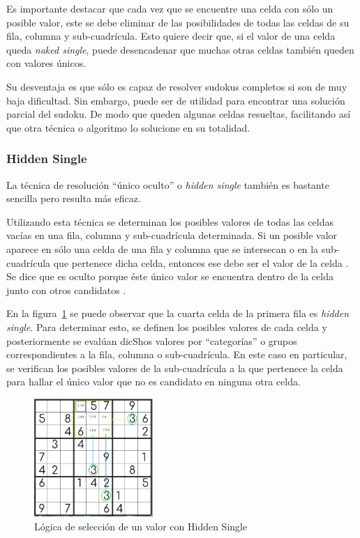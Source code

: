 \documentclass[conference]{IEEEtran}
\begin{document}
Es importante destacar que cada vez que se encuentre una celda con sólo un posible valor, este se debe eliminar de las posibilidades de todas las celdas de su fila, columna y sub-cuadrícula. Esto quiere decir que, si el valor de una celda queda \textit{naked single}, puede desencadenar que muchas otras celdas también queden con valores únicos.

Su desventaja es que sólo es capaz de resolver sudokus completos si son de muy baja dificultad. Sin embargo, puede ser de utilidad para encontrar una solución parcial del sudoku. De modo que queden algunas celdas resueltas, facilitando así que otra técnica o algoritmo lo solucione en su totalidad.

\subsubsection{Hidden Single}
La técnica de resolución “único oculto” o \textit{hidden single} también es bastante sencilla pero resulta más eficaz.

Utilizando esta técnica se determinan los posibles valores de todas las celdas vacías en una fila, columna y sub-cuadrícula determinada. Si un posible valor aparece en sólo una celda de una fila y columna que se intersecan o en la sub-cuadrícula que pertenece dicha celda, entonces ese debe ser el valor de la celda \cite{hiddenSolving}. Se dice que es oculto porque éste único valor se encuentra dentro de la celda junto con otros candidatos \cite{individual}.

En la figura~\ref{fig:hidden1} se puede observar que la cuarta celda de la primera fila es \textit{hidden single}. Para determinar esto, se definen los posibles valores de cada celda y posteriormente se evalúan dicShos valores por “categorías” o grupos correspondientes a la fila, columna o sub-cuadrícula. En este caso en particular, se verifican los posibles valores de la sub-cuadrícula a la que pertenece la celda para hallar el único valor que no es candidato en ninguna otra celda.

\begin{otherlanguage}{spanish}
\begin{figure}[H]
\centering
\includegraphics[width=0.4\textwidth]{hiddensingle1.png}
\caption{\label{fig:hidden1}Lógica de selección de un valor con Hidden Single}
\end{figure}
\end{otherlanguage}
\end{document}
